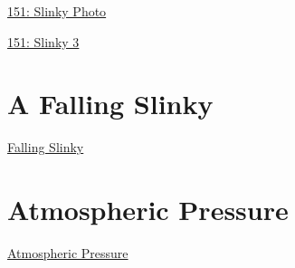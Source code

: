 \documentclass{ximera}
\begin{document}
\begin{onlineOnly}
    \begin{center}
\end{center}
\end{onlineOnly}

\href{https://www.desmos.com/calculator/zqjjgael5j}{151: Slinky Photo}



\begin{onlineOnly}
    \begin{center}
\end{center}
\end{onlineOnly}

\href{https://www.desmos.com/calculator/ew24lplwqf}{151: Slinky 3}



\section{A Falling Slinky}

\href{https://www.youtube.com/watch?v=eCMmmEEyOO0}{Falling Slinky}


\section{Atmospheric Pressure}

\href{https://projects.iq.harvard.edu/files/acmg/files/intro_atmo_chem_bookchap2.pdf}{Atmospheric Pressure} 
\end{document}

